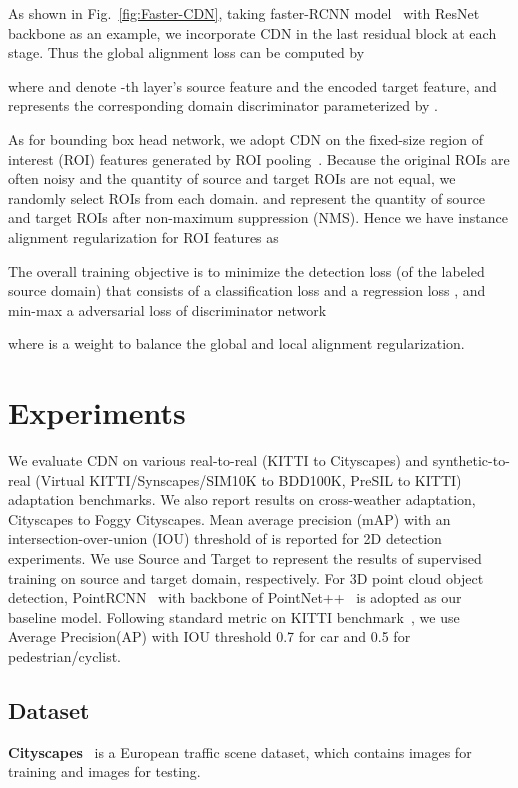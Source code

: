 \documentclass[runningheads]{llncs}
\begin{document}
As shown in Fig.~\ref{fig:Faster-CDN}, taking faster-RCNN model~\cite{ren2015faster} with ResNet~\cite{he2016deep} backbone as an example, we incorporate CDN in the last residual block at each stage.
Thus the global alignment loss can be computed by

where  and  denote -th layer's source feature and the encoded target feature, and  represents the corresponding domain discriminator parameterized by .

As for bounding box head network, we adopt CDN on the fixed-size region of interest (ROI) features generated by ROI pooling~\cite{ren2015faster}.
Because the original ROIs are often noisy and the quantity of source and target ROIs are not equal,
we randomly select  ROIs from each domain.
 and  represent the quantity of source and target ROIs after non-maximum suppression (NMS).
Hence we have instance alignment regularization for ROI features as


The overall training objective is to minimize the detection loss  (of the labeled source domain) that consists of a classification loss  and a regression loss , and min-max a adversarial loss  of discriminator network

where  is a weight to balance the global and local alignment regularization.



\section{Experiments}
We evaluate CDN on various real-to-real (KITTI to Cityscapes) and synthetic-to-real (Virtual KITTI/Synscapes/SIM10K to BDD100K, PreSIL to KITTI) adaptation benchmarks.
We also report results on cross-weather adaptation, Cityscapes to Foggy Cityscapes.
Mean average precision (mAP) with an intersection-over-union (IOU) threshold of  is reported for 2D detection experiments.
We use Source and Target to represent the results of supervised training on source and target domain, respectively.
For 3D point cloud object detection,
PointRCNN~\cite{shi2019pointrcnn} with backbone of PointNet++~\cite{qi2017pointnet++} is adopted as our baseline model.
Following standard metric on KITTI benchmark~\cite{shi2019pointrcnn}, we use Average Precision(AP) with IOU threshold 0.7 for car and 0.5 for pedestrian/cyclist.

\subsection{Dataset}
{\bf Cityscapes}~\cite{cordts2016cityscapes}
is a European traffic scene dataset, which contains  images for training and  images for testing.
\end{document}
